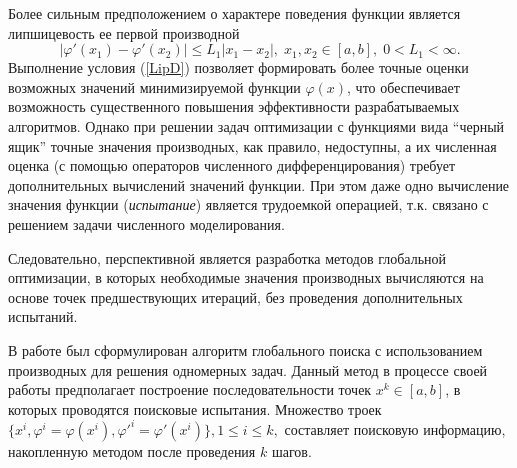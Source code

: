 \documentclass[11pt, oneside, a4paper]{article}
\begin{document}
Более сильным предположением о характере поведения функции является липшицевость ее первой производной 
\begin{equation}\label{LipD}
\left|\varphi'(x_1)-\varphi'(x_2)\right|\leq L_1\left|x_1-x_2\right|,\; x_1,x_2 \in [a,b],\; 0<L_1<\infty.
\end{equation}
Выполнение условия (\ref{LipD}) позволяет формировать более точные оценки возможных значений минимизируемой функции $\varphi(x)$, что обеспечивает возможность существенного повышения эффективности разрабатываемых алгоритмов. 
Однако при решении задач оптимизации с функциями вида ``черный ящик'' точные значения производных, как правило, недоступны, а их численная оценка (с помощью операторов численного дифференцирования) требует дополнительных вычислений значений функции. 
При этом даже одно вычисление значения функции (\textit{испытание}) является трудоемкой операцией, т.к. связано с решением задачи численного моделирования.   

Следовательно, перспективной является разработка методов глобальной оптимизации, в которых необходимые значения производных вычисляются на основе точек предшествующих итераций, без проведения дополнительных испытаний.  




В работе \cite{Gergel96} был сформулирован алгоритм глобального поиска с использованием производных для решения одномерных задач. 
Данный метод в процессе своей работы предполагает построение последовательности точек $x^k\in[a,b]$, в которых проводятся поисковые испытания. Множество троек $ \{ x^i, \varphi^i=\varphi (x^i), \varphi'^i=\varphi'(x^i)\}, 1\leq i \leq k,$ составляет поисковую информацию, накопленную методом после проведения $k$ шагов. 
\end{document}
